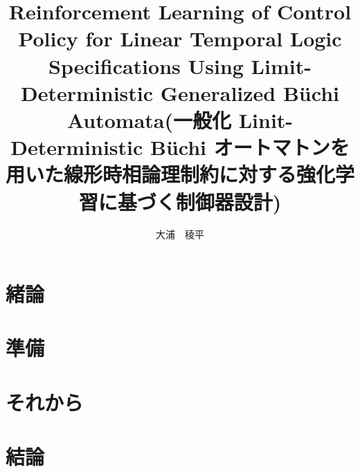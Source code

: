 \documentclass[a4j,10pt,twocolumn]{abstract}
\title{Reinforcement Learning of Control Policy for Linear Temporal Logic Specifications Using Limit-Deterministic Generalized B\"{u}chi Automata(一般化 Linit-Deterministic B\"{u}chi オートマトンを用いた線形時相論理制約に対する強化学習に基づく制御器設計)}	%
\author{大浦　稜平} 		%
\theoremstyle{definition}
\begin{document}
\maketitle 		%

\section{緒論}

\section{準備}

\section{それから}

\section{結論}

%
%
\begin{thebibliography}{1}
\bibitem{}
\end{thebibliography}
\newpage
\pagebreak
\end{document}
